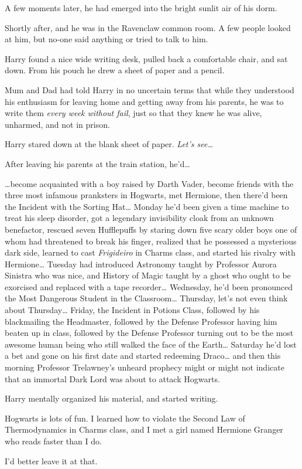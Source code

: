 A few moments later, he had emerged into the bright sunlit air of his dorm.

Shortly after, and he was in the Ravenclaw common room. A few people looked at him, but no-one said anything or tried to talk to him.

Harry found a nice wide writing desk, pulled back a comfortable chair, and sat down. From his pouch he drew a sheet of paper and a pencil.

Mum and Dad had told Harry in no uncertain terms that while they understood his enthusiasm for leaving home and getting away from his parents, he was to write them \emph{every week without fail}, just so that they knew he was alive, unharmed, and not in prison.

Harry stared down at the blank sheet of paper. \emph{Let's see{\ldots}}

After leaving his parents at the train station, he'd{\ldots}

{\ldots}become acquainted with a boy raised by Darth Vader, become friends with the three most infamous pranksters in Hogwarts, met Hermione, then there'd been the Incident with the Sorting Hat{\ldots} Monday he'd been given a time machine to treat his sleep disorder, got a legendary invisibility cloak from an unknown benefactor, rescued seven Hufflepuffs by staring down five scary older boys one of whom had threatened to break his finger, realized that he possessed a mysterious dark side, learned to cast \emph{Frigideiro} in Charms class, and started his rivalry with Hermione{\ldots} Tuesday had introduced Astronomy taught by Professor Aurora Sinistra who was nice, and History of Magic taught by a ghost who ought to be exorcised and replaced with a tape recorder{\ldots} Wednesday, he'd been pronounced the Most Dangerous Student in the Classroom{\ldots} Thursday, let's not even think about Thursday{\ldots} Friday, the Incident in Potions Class, followed by his blackmailing the Headmaster, followed by the Defense Professor having him beaten up in class, followed by the Defense Professor turning out to be the most awesome human being who still walked the face of the Earth{\ldots} Saturday he'd lost a bet and gone on his first date and started redeeming Draco{\ldots} and then this morning Professor Trelawney's unheard prophecy might or might not indicate that an immortal Dark Lord was about to attack Hogwarts.

Harry mentally organized his material, and started writing.

\begin{writtenNote}

Hogwarts is lots of fun. I learned how to violate the Second Law of Thermodynamics in Charms class, and I met a girl named Hermione Granger who reads faster than I do.

I'd better leave it at that.

\end{writtenNote}

